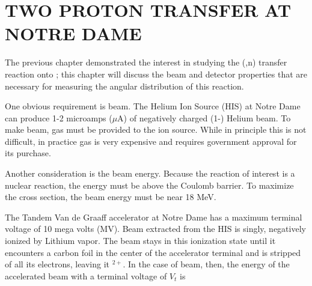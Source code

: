 %
%
%
%
%
%
%
%

%
%

\chapter{TWO PROTON TRANSFER AT NOTRE DAME}
\label{chap:2pExpt}

The previous chapter demonstrated the interest in studying the (,n) transfer reaction onto \GeTargets ; this chapter will discuss the beam and detector properties that are necessary for measuring the angular distribution of this reaction.

One obvious requirement is  beam.  The Helium Ion Source (HIS) at Notre Dame can produce 1-2 microamps ($\mu$A) of negatively charged (1-) Helium beam.  To make  beam,  gas must be provided to the ion source.  While in principle this is not difficult, in practice  gas is very expensive and requires government approval for its purchase.  

Another consideration is the beam energy.  Because the reaction of interest is a nuclear reaction, the energy must be above the Coulomb barrier.  To maximize the cross section, the beam energy must be near 18 MeV.

The Tandem Van de Graaff accelerator at Notre Dame has a maximum terminal voltage of 10 mega volts (MV).  Beam extracted from the HIS is singly, negatively ionized by Lithium vapor.  The beam stays in this ionization state until it encounters a carbon foil in the center of the accelerator terminal and is stripped of all its electrons, leaving it $^{2+}$.  In the case of  beam, then, the energy of the accelerated beam with a terminal voltage of $V_t$ is 


